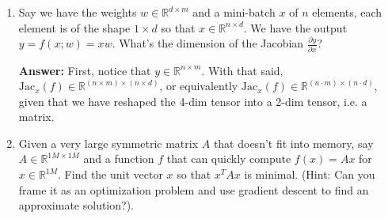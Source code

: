 \documentclass{article}
\newenvironment{QandA}{\begin{enumerate}[label=\arabic*.]}{\end{enumerate}}
\newenvironment{answer}{\par\normalfont \textbf{Answer:}}{}
\newcommand{\R}{\mathbb{R}}
\newcommand{\Jac}{\text{Jac}}
\begin{document}
\begin{QandA}
    \item Say we have the weights $w \in \R^{d \times m}$ and a mini-batch $x$ of $n$ elements, each element is of the shape $1 \times d$ so that $x \in \R^{n \times d}$. We have the output $y = f(x; w) = xw$. What's the dimension of the Jacobian $\frac{\partial y}{\partial x}$?
    \begin{answer}
        First, notice that $y \in \R^{n \times m}$. With that said, $\Jac_x(f) \in \R^{(n \times m) \times (n \times d)}$, or equivalently $\Jac_x(f) \in \R^{(n \cdot m) \times (n \cdot d)}$, given that we have reshaped the 4-dim tensor into a 2-dim tensor, i.e. a matrix.
    \end{answer}
    
    \item Given a very large symmetric matrix $A$ that doesn't fit into memory, say $A \in \R^{1M \times 1M}$ and a function $f$ that can quickly compute $f(x) = Ax$ for $x \in \R^{1M}$. Find the unit vector $x$ so that $x^T A x$ is minimal. (Hint: Can you frame it as an optimization problem and use gradient descent to find an approximate solution?).
    

\end{QandA}
\end{document}

